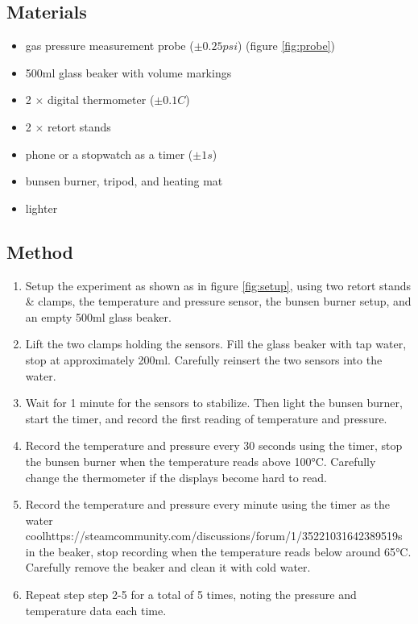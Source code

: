 \documentclass[a4paper,12pt]{article}
\begin{document}
\subsection{Materials}

\begin{itemize}
    \item gas pressure measurement probe ($\pm 0.25\si{psi}$) (figure \ref{fig:probe})
    \item 500ml glass beaker with volume markings
    \item 2 $\times$ digital thermometer ($\pm 0.1\si{C}$)
    \item 2 $\times$ retort stands
    \item phone or a stopwatch as a timer ($\pm 1\si{s}$)
    \item bunsen burner, tripod, and heating mat
    \item lighter
\end{itemize}

\subsection{Method}


\begin{enumerate}
    \item Setup the experiment as shown as in figure \ref{fig:setup}, using two retort stands \& clamps, the temperature and pressure sensor, the bunsen burner setup, and an empty 500ml glass beaker.
    \item Lift the two clamps holding the sensors. Fill the glass beaker with tap water, stop at approximately 200ml. Carefully reinsert the two sensors into the water.
    \item Wait for 1 minute for the sensors to stabilize. Then light the bunsen burner, start the timer, and record the first reading of temperature and pressure.
    \item Record the temperature and pressure every 30 seconds using the timer, stop the bunsen burner when the temperature reads above 100$\si{\celsius}$. Carefully change the thermometer if the displays become hard to read.
    \item Record the temperature and pressure every minute using the timer as the water coolhttps://steamcommunity.com/discussions/forum/1/35221031642389519s in the beaker, stop recording when the temperature reads below around 65$\si{\celsius}$. Carefully remove the beaker and clean it with cold water.
    \item Repeat step step 2-5 for a total of 5 times, noting the pressure and temperature data each time.
\end{enumerate}
\end{document}
